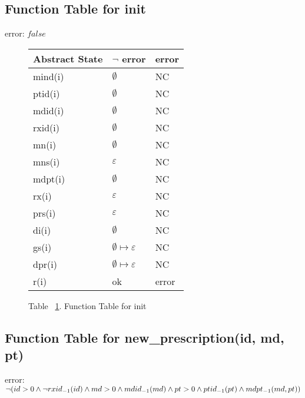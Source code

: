 \subsection{Function Table for init}

error: $false$

\begin{figure}[h]
\begin{center}

\begin{tabular}{|l|l|l|}
\hline
Abstract State & $\neg$ error & error \\ \hline
mind(i)        &   $\emptyset$      & NC    \\ \hline
ptid(i)        &       $\emptyset$    & NC    \\ \hline
mdid(i)        &    $\emptyset$       & NC    \\ \hline
rxid(i)        &      $\emptyset$     & NC    \\ \hline
mn(i)          &       $\emptyset$    & NC    \\ \hline
mns(i)         &   $ \varepsilon$       & NC    \\ \hline
mdpt(i)        &      $\emptyset$     & NC    \\ \hline
rx(i)          &    $ \varepsilon  $    & NC    \\ \hline
prs(i)         &   $ \varepsilon $      & NC    \\ \hline
di(i)          &     $\emptyset$      & NC    \\ \hline
gs(i)          &      $\emptyset \mapsto \varepsilon$     & NC    \\ \hline
dpr(i)         &       $\emptyset \mapsto \varepsilon $    & NC    \\ \hline
r(i)           & ok        & error \\ \hline
\end{tabular}

\caption{Table ~\ref{ft-init}. Function Table for init}
\label{ft-init}
\end{center}
\end{figure}

\newpage

\subsection{Function Table for new\_prescription(id, md, pt)}

error: $\neg(\newline id > 0 \newline\wedge \neg rxid_{-1}(id) \newline\wedge md > 0  \newline\wedge mdid_{-1}(md) \newline\wedge pt > 0 \newline\wedge ptid_{-1}(pt) \newline\wedge mdpt_{-1}(md, pt))$


